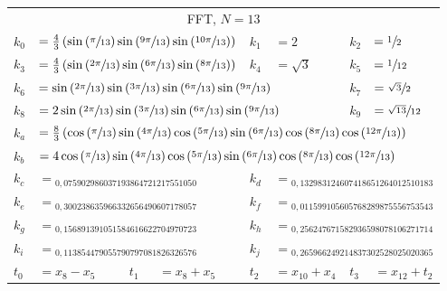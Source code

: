 \begin{tabular}{|p{4.3pt}l|p{4.3pt}l|p{4.3pt}l|p{4.3pt}l|}\toprule \multicolumn{8}{|c|}{FFT, $N=13$} \\
$k_0 $ &\multicolumn{3}{l|}{$= \frac{4}{3}\left(\sin\left(\sfrac{\pi}{13}\right)\sin\left(\sfrac{9\pi}{13}\right)\sin\left(\sfrac{10\pi}{13}\right)\right)$} & $k_1 $ &$= 2$ & $k_2 $ &$= \sfrac{1}{2}$\\ 
$k_3 $ &\multicolumn{3}{l|}{$= \frac{4}{3}\left(\sin\left(\sfrac{2\pi}{13}\right)\sin\left(\sfrac{6\pi}{13}\right)\sin\left(\sfrac{8\pi}{13}\right)\right)$} & $k_4 $ &$= \sqrt{3}$ & $k_5 $ &$= \sfrac{1}{12}$\\ 
$k_6 $ &\multicolumn{5}{l|}{$= \sin\left(\sfrac{2\pi}{13}\right)\sin\left(\sfrac{3\pi}{13}\right)\sin\left(\sfrac{6\pi}{13}\right)\sin\left(\sfrac{9\pi}{13}\right)$} & $k_7 $ &$= \sfrac{\sqrt{3}}{2}$\\ 
$k_8 $ &\multicolumn{5}{l|}{$= 2\sin\left(\sfrac{2\pi}{13}\right)\sin\left(\sfrac{3\pi}{13}\right)\sin\left(\sfrac{6\pi}{13}\right)\sin\left(\sfrac{9\pi}{13}\right)$} & $k_9 $ &$= \sfrac{\sqrt{13}}{12}$\\ 
$k_a $ &\multicolumn{7}{l|}{$= \frac{8}{3}\left(\cos\left(\sfrac{\pi}{13}\right)\sin\left(\sfrac{4\pi}{13}\right)\cos\left(\sfrac{5\pi}{13}\right)\sin\left(\sfrac{6\pi}{13}\right)\cos\left(\sfrac{8\pi}{13}\right)\cos\left(\sfrac{12\pi}{13}\right)\right)$}\\ 
$k_b $ &\multicolumn{7}{l|}{$= 4\cos\left(\sfrac{\pi}{13}\right)\sin\left(\sfrac{4\pi}{13}\right)\cos\left(\sfrac{5\pi}{13}\right)\sin\left(\sfrac{6\pi}{13}\right)\cos\left(\sfrac{8\pi}{13}\right)\cos\left(\sfrac{12\pi}{13}\right)$}\\ 
$k_c $ &\multicolumn{3}{l|}{$= {}_{0{,}075902986037193864721217551050}$} & $k_d $ &\multicolumn{3}{l|}{$= {}_{0{,}132983124607418651264012510183}$}\\ 
$k_e $ &\multicolumn{3}{l|}{$= {}_{0{,}300238635966332656490607178057}$} & $k_f $ &\multicolumn{3}{l|}{$= {}_{0{,}011599105605768289875556753543}$}\\ 
$k_g $ &\multicolumn{3}{l|}{$= {}_{0{,}156891391051584616622704970723}$} & $k_h $ &\multicolumn{3}{l|}{$= {}_{0{,}256247671582936598078106271714}$}\\ 
$k_i $ &\multicolumn{3}{l|}{$= {}_{0{,}113854479055790797081826326576}$} & $k_j $ &\multicolumn{3}{l|}{$= {}_{0{,}265966249214837302528025020365}$}\\ 
$t_0 $ &$= x_8 - x_5$ & $t_1 $ &$= x_8 + x_5$ & $t_2 $ &$= x_{10} + x_4$ & $t_3 $ &$= x_{12} + t_2$\\ 

\end{tabular}
